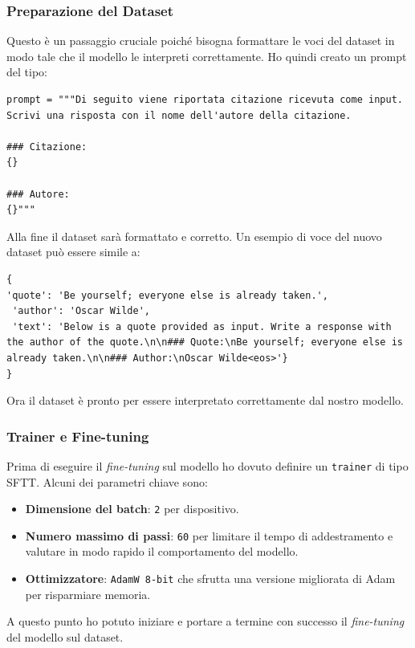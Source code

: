 \subsubsection{Preparazione del Dataset}
Questo \`e un passaggio cruciale poich\'e bisogna formattare le voci del dataset in modo tale che il modello le interpreti correttamente. Ho quindi creato un prompt del tipo:
\begin{lstlisting}
prompt = """Di seguito viene riportata citazione ricevuta come input. Scrivi una risposta con il nome dell'autore della citazione.

### Citazione:
{}

### Autore:
{}"""
\end{lstlisting}
Alla fine il dataset sar\`a formattato e corretto. Un esempio di voce del nuovo dataset pu\`o essere simile a:
\begin{lstlisting}
{
'quote': 'Be yourself; everyone else is already taken.',
 'author': 'Oscar Wilde',
 'text': 'Below is a quote provided as input. Write a response with the author of the quote.\n\n### Quote:\nBe yourself; everyone else is already taken.\n\n### Author:\nOscar Wilde<eos>'}
}
\end{lstlisting}
Ora il dataset \`e pronto per essere interpretato correttamente dal nostro modello.

\subsubsection{Trainer e Fine-tuning}
Prima di eseguire il \emph{fine-tuning} sul modello ho dovuto definire un \texttt{trainer} di tipo \texttt{}{SFTT}. Alcuni dei parametri chiave sono:
\begin{itemize}
    \item \textbf{Dimensione del batch}: \texttt{2} per dispositivo.
    \item \textbf{Numero massimo di passi}: \texttt{60} per limitare il tempo di addestramento e valutare in modo rapido il comportamento del modello.
    \item \textbf{Ottimizzatore}: \texttt{AdamW 8-bit} che sfrutta una versione migliorata di Adam per risparmiare memoria.
\end{itemize}
A questo punto ho potuto iniziare e portare a termine con successo il \emph{fine-tuning} del modello sul dataset.

